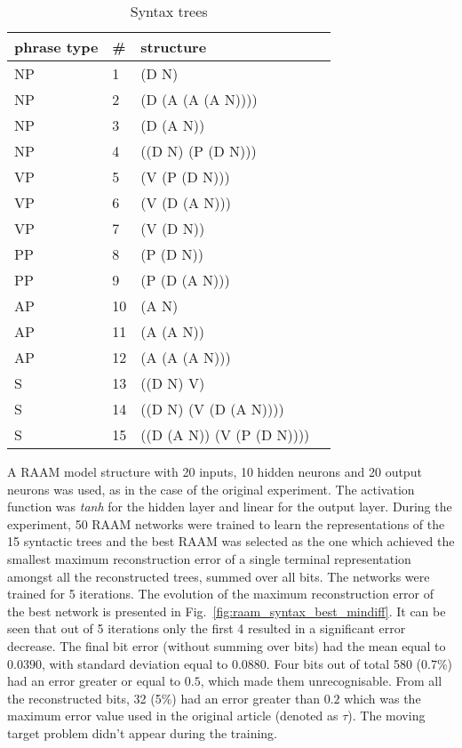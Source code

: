 \documentclass[]{spie}  %
\begin{document}
\begin{table}[h!]
	\begin{center}
	\begin{tabular}{llll}
	\toprule
	phrase type & \# & structure \\
	\midrule
	NP & 1 & (D N)\\
	NP & 2 & (D (A (A (A N))))\\
	NP & 3 & (D (A N))\\
	NP & 4 & ((D N) (P (D N)))\\
	\midrule
	VP & 5 & (V (P (D N)))\\
	VP & 6 & (V (D (A N)))\\
	VP & 7 & (V (D N))\\
	\midrule
	PP & 8 & (P (D N))\\
	PP & 9 & (P (D (A N)))\\
	\midrule
	AP & 10 & (A N)\\
	AP & 11 & (A (A N))\\
	AP & 12 & (A (A (A N)))\\
	\midrule
	S & 13 & ((D N) V)\\
	S & 14 & ((D N) (V (D (A N))))\\
	S & 15 & ((D (A N)) (V (P (D N))))\\
	\bottomrule
	\end{tabular}
	\caption{Syntax trees}
	\label{tab:syntax}
	\end{center}
\end{table}


A RAAM model structure with 20 inputs, 10 hidden neurons and 20 output neurons was used, as in the case of the original experiment. The activation function was \emph{tanh} for the hidden layer and linear for the output layer. During the experiment, 50 RAAM networks were trained to learn the representations of the 15 syntactic trees and the best RAAM was selected as the one which achieved the smallest maximum reconstruction error of a single terminal representation amongst all the reconstructed trees, summed over all bits. The networks were trained for 5 iterations. The evolution of the maximum reconstruction error of the best network is presented in Fig.~\ref{fig:raam_syntax_best_mindiff}. It can be seen that out of 5 iterations only the first 4 resulted in a significant error decrease. The final bit error (without summing over bits) had the mean equal to $0.0390$, with standard deviation equal to $0.0880$. Four bits out of total 580 (0.7\%) had an error greater or equal to $0.5$, which made them unrecognisable. From all the reconstructed bits, 32 (5\%) had an error greater than $0.2$ which was the maximum error value used in the original article (denoted as $\tau$). The moving target problem didn't appear during the training.
\end{document}
